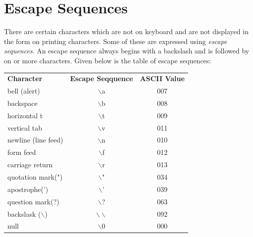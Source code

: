 \section{Escape Sequences}
There are certain characters which are not on keyboard and are not displayed in
the form on printing characters. Some of these are expressed using
\textit{escape sequences}. An escape sequence always begins with a backslash
and is followed by on or more characters. Given below is the table of escape
sequences:

\begin{table}[!h]
\begin{center}
\caption{Escape Sequences}
\begin{longtable}{lcc}
\textbf{Character}&\textbf{Escape Seqquence}&\textbf{ASCII Value}\\
bell (alert)&$\backslash$a&007\\
backspace&$\backslash$b&008\\
horizontal t&$\backslash$t&009\\
vertical tab&$\backslash$v&011\\
newline (line feed)&$\backslash$n&010\\
form feed&$\backslash$f&012\\
carriage return&$\backslash$r&013\\
quotation mark(")&$\backslash$"&034\\
apostrophe(')&$\backslash$'&039\\
question mark(?)&$\backslash$?&063\\
backslask ($\backslash$)&$\backslash\backslash$&092\\
null&$\backslash$0&000
\end{longtable}
\end{center}
\end{table}